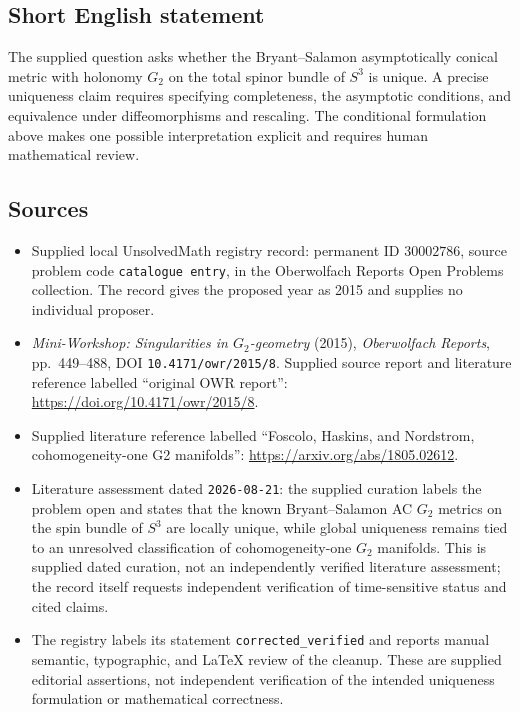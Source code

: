 \documentclass[11pt]{article}
\begin{document}
\subsection{Short English statement}
The supplied question asks whether the Bryant--Salamon asymptotically conical metric with holonomy \(G_2\) on the total spinor bundle of \(S^3\) is unique. A precise uniqueness claim requires specifying completeness, the asymptotic conditions, and equivalence under diffeomorphisms and rescaling. The conditional formulation above makes one possible interpretation explicit and requires human mathematical review.
\subsection{Sources}
\begin{itemize}
\item Supplied local UnsolvedMath registry record: permanent ID \(30002786\), source problem code \texttt{catalogue entry}, in the Oberwolfach Reports Open Problems collection. The record gives the proposed year as 2015 and supplies no individual proposer.
\item \emph{Mini-Workshop: Singularities in \(G_2\)-geometry} (2015), \emph{Oberwolfach Reports}, pp.\ 449--488, DOI \texttt{10.4171/owr/2015/8}. Supplied source report and literature reference labelled ``original OWR report'': \url{https://doi.org/10.4171/owr/2015/8}.
\item Supplied literature reference labelled ``Foscolo, Haskins, and Nordstrom, cohomogeneity-one G2 manifolds'': \url{https://arxiv.org/abs/1805.02612}.
\item Literature assessment dated \texttt{2026-08-21}: the supplied curation labels the problem open and states that the known Bryant--Salamon AC \(G_2\) metrics on the spin bundle of \(S^3\) are locally unique, while global uniqueness remains tied to an unresolved classification of cohomogeneity-one \(G_2\) manifolds. This is supplied dated curation, not an independently verified literature assessment; the record itself requests independent verification of time-sensitive status and cited claims.
\item The registry labels its statement \texttt{corrected\_verified} and reports manual semantic, typographic, and LaTeX review of the cleanup. These are supplied editorial assertions, not independent verification of the intended uniqueness formulation or mathematical correctness.
\end{itemize}
\end{document}
